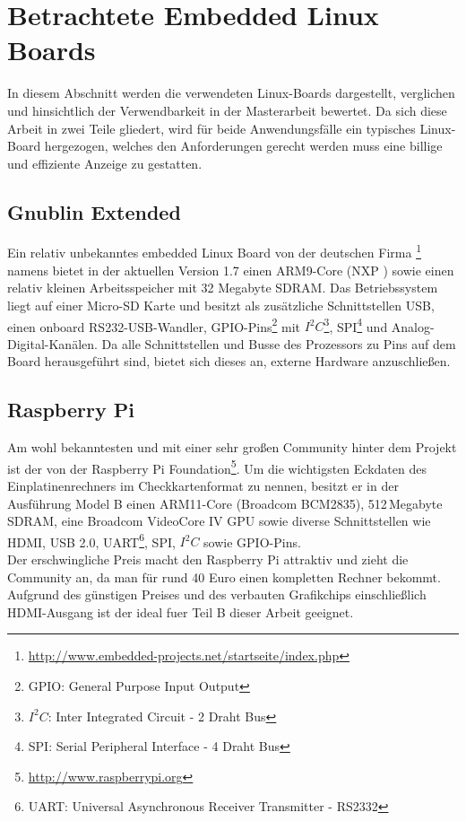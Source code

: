 \section{Betrachtete Embedded Linux Boards}
\label{cha:betrachtete_linux_boards}
In diesem Abschnitt werden die verwendeten Linux-Boards dargestellt, verglichen und hinsichtlich der Verwendbarkeit in der Masterarbeit bewertet. Da sich diese Arbeit in zwei Teile gliedert, wird für beide Anwendungsfälle ein typisches Linux-Board hergezogen, welches den Anforderungen gerecht werden muss eine billige und effiziente Anzeige zu gestatten.
\subsection{Gnublin Extended}
\label{cha:gnublin_extended}
Ein relativ unbekanntes embedded Linux Board von der deutschen Firma \footnote{\url{http://www.embedded-projects.net/startseite/index.php}} namens  bietet in der aktuellen Version 1.7 einen ARM9-Core (NXP ) sowie einen relativ kleinen Arbeitsspeicher mit 32 Megabyte SDRAM. Das Betriebssystem liegt auf einer Micro-SD Karte und besitzt als zusätzliche Schnittstellen USB, einen onboard RS232-USB-Wandler, GPIO-Pins\footnote{GPIO: General Purpose Input Output} mit $I^2C$\footnote{$I^2C$: Inter Integrated Circuit - 2 Draht Bus}, SPI\footnote{SPI: Serial Peripheral Interface - 4 Draht Bus} und Analog-Digital-Kanälen. 
Da alle Schnittstellen und Busse des Prozessors zu Pins auf dem Board herausgeführt sind, bietet sich dieses an, externe Hardware anzuschließen.
\subsection{Raspberry Pi}
\label{cha:raspberry}
Am wohl bekanntesten und mit einer sehr großen Community hinter dem Projekt ist der  von der Raspberry Pi Foundation\footnote{\url{http://www.raspberrypi.org}}. Um die wichtigsten Eckdaten des Einplatinenrechners im Checkkartenformat zu nennen, besitzt er in der Ausführung Model B einen ARM11-Core (Broadcom BCM2835), 512\,Megabyte SDRAM, eine Broadcom VideoCore IV GPU sowie diverse Schnittstellen wie HDMI, USB 2.0, UART\footnote{UART: Universal Asynchronous Receiver Transmitter - RS2332}, SPI, $I^2C$ sowie GPIO-Pins.\\
Der erschwingliche Preis macht den Raspberry Pi attraktiv und zieht die Community an, da man für rund 40 Euro einen kompletten Rechner bekommt. \\
Aufgrund des günstigen Preises und des verbauten Grafikchips einschließlich HDMI-Ausgang ist der  ideal fuer Teil B dieser Arbeit geeignet.

